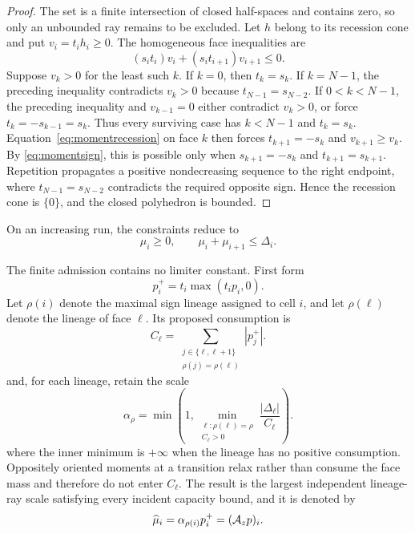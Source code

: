 \begin{proof}
The set is a finite intersection of closed half-spaces and contains zero, so
only an unbounded ray remains to be excluded. Let \(h\) belong to its
recession cone and put \(v_i=t_ih_i\geq0\). The homogeneous face inequalities
are
\begin{equation}
 (s_it_i)v_i+(s_it_{i+1})v_{i+1}\leq0.
 \label{eq:momentrecession}
\end{equation}
Suppose \(v_k>0\) for the least such \(k\). If \(k=0\), then \(t_k=s_k\).
If \(k=N-1\), the preceding inequality contradicts \(v_k>0\) because
\(t_{N-1}=s_{N-2}\). If \(0<k<N-1\), the preceding inequality and
\(v_{k-1}=0\) either contradict \(v_k>0\), or force
\(t_k=-s_{k-1}=s_k\). Thus every surviving case has \(k<N-1\) and
\(t_k=s_k\). Equation~\eqref{eq:momentrecession} on face \(k\) then forces
\(t_{k+1}=-s_k\) and \(v_{k+1}\geq v_k\). By
\eqref{eq:momentsign}, this is possible only when
\(s_{k+1}=-s_k\) and \(t_{k+1}=s_{k+1}\). Repetition propagates a positive
nondecreasing sequence to the right endpoint, where
\(t_{N-1}=s_{N-2}\) contradicts the required opposite sign. Hence the
recession cone is \(\{0\}\), and the closed polyhedron is bounded.
\end{proof}

On an increasing run, the constraints reduce to
\begin{equation}
 \mu_i\geq0,\qquad \mu_i+\mu_{i+1}\leq\Delta_i.
 \label{eq:monotonemoment}
\end{equation}

The finite admission contains no limiter constant. First form
\begin{equation}
p_i^+=t_i\max(t_ip_i,0).
 \label{eq:momentorthant}
\end{equation}
Let \(\rho(i)\) denote the maximal sign lineage assigned to cell \(i\), and
let \(\rho(\ell)\) denote the lineage of face \(\ell\). Its proposed
consumption is
\begin{equation}
 C_\ell=\sum_{\substack{j\in\{\ell,\ell+1\}\\
                        \rho(j)=\rho(\ell)}}|p_j^+|.
 \label{eq:momentconsumption}
\end{equation}
and, for each lineage, retain the scale
\begin{equation}
\alpha_\rho=\min\left(
 1,\min_{\substack{\ell:\rho(\ell)=\rho\\C_\ell>0}}
 \frac{|\Delta_\ell|}{C_\ell}\right).
 \label{eq:momentrayscale}
\end{equation}
where the inner minimum is \(+\infty\) when the lineage has no positive
consumption. Oppositely oriented moments at a transition relax rather than
consume the face mass and therefore do not enter \(C_\ell\). The result is the
largest independent lineage-ray scale satisfying every incident capacity
bound, and it is denoted by
\begin{equation}
 \widehat\mu_i=\alpha_{\rho(i)}p_i^+=(\mathcal{A}_zp)_i.
 \label{eq:momentadmission}
\end{equation}

